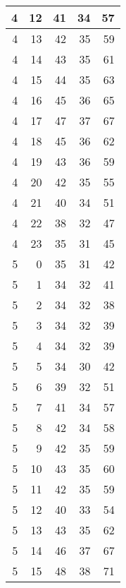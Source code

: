 \begin{longtable}{|r|r|r|r|r|}
    \hline
    4     & 12    & 41    & 34    & 57 \\
    \hline
    4     & 13    & 42    & 35    & 59 \\
    \hline
    4     & 14    & 43    & 35    & 61 \\
    \hline
    4     & 15    & 44    & 35    & 63 \\
    \hline
    4     & 16    & 45    & 36    & 65 \\
    \hline
    4     & 17    & 47    & 37    & 67 \\
    \hline
    4     & 18    & 45    & 36    & 62 \\
    \hline
    4     & 19    & 43    & 36    & 59 \\
    \hline
    4     & 20    & 42    & 35    & 55 \\
    \hline
    4     & 21    & 40    & 34    & 51 \\
    \hline
    4     & 22    & 38    & 32    & 47 \\
    \hline
    4     & 23    & 35    & 31    & 45 \\
    \hline
    5     & 0     & 35    & 31    & 42 \\
    \hline
    5     & 1     & 34    & 32    & 41 \\
    \hline
    5     & 2     & 34    & 32    & 38 \\
    \hline
    5     & 3     & 34    & 32    & 39 \\
    \hline
    5     & 4     & 34    & 32    & 39 \\
    \hline
    5     & 5     & 34    & 30    & 42 \\
    \hline
    5     & 6     & 39    & 32    & 51 \\
    \hline
    5     & 7     & 41    & 34    & 57 \\
    \hline
    5     & 8     & 42    & 34    & 58 \\
    \hline
    5     & 9     & 42    & 35    & 59 \\
    \hline
    5     & 10    & 43    & 35    & 60 \\
    \hline
    5     & 11    & 42    & 35    & 59 \\
    \hline
    5     & 12    & 40    & 33    & 54 \\
    \hline
    5     & 13    & 43    & 35    & 62 \\
    \hline
    5     & 14    & 46    & 37    & 67 \\
    \hline
    5     & 15    & 48    & 38    & 71 \\

\end{longtable}
